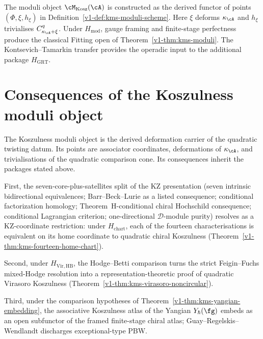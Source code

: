 \begin{remark}
\label{v1-rem:kms-construction-not-narration}
The moduli object $\cM_{\mathrm{Kosz}}(\cA)$ is constructed as
the derived functor of points
$(\Phi,\xi,h_\xi)$ in Definition~\ref{v1-def:kms-moduli-scheme}.
Here $\xi$ deforms $\kappa_\cA$ and $h_\xi$ trivialises
$C^q_{\kappa_\cA+\xi}$.  Under $H_{\mathrm{mod}}$, gauge framing
and finite-stage perfectness produce the classical Fitting open of
Theorem~\ref{v1-thm:kms-moduli}.  The Kontsevich--Tamarkin transfer
provides the operadic input to the additional package
$H_{\mathrm{GRT}}$.
\end{remark}

\section{Consequences of the Koszulness moduli object}
\label{v1-sec:kms-summary}

The Koszulness moduli object is the derived deformation carrier of
the quadratic twisting datum.  Its points are associator coordinates,
deformations of $\kappa_\cA$, and trivialisations of the quadratic
comparison cone.  Its consequences inherit the packages stated
above.

First, the seven-core-plus-satellites split of the
KZ presentation (seven intrinsic bidirectional equivalences;
Barr--Beck--Lurie as a listed consequence; conditional
factorization homology; Theorem~H-conditional chiral Hochschild consequence;
conditional Lagrangian criterion; one-directional
$\mathcal{D}$-module purity) resolves as a KZ-coordinate restriction:
under $H_{\mathrm{chart}}$, each of the fourteen
characterisations is equivalent on its home coordinate to quadratic
chiral Koszulness
(Theorem~\ref{v1-thm:kms-fourteen-home-chart}).

Second, under $H_{\mathrm{Vir,HB}}$, the Hodge--Betti comparison
turns the strict Feigin--Fuchs mixed-Hodge resolution into a
representation-theoretic proof of quadratic Virasoro Koszulness
(Theorem~\ref{v1-thm:kms-virasoro-noncircular}).

Third, under the comparison hypotheses of
Theorem~\ref{v1-thm:kms-yangian-embedding}, the associative
Koszulness atlas of the Yangian
$Y_\hbar(\fg)$ embeds as an open subfunctor of the framed
finite-stage chiral atlas;
Guay--Regelskis--Wendlandt \cite{GRW18}
discharges exceptional-type PBW.

